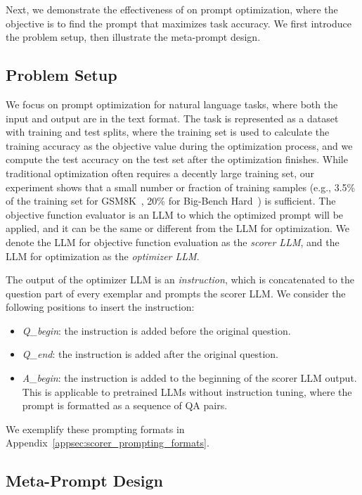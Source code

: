 Next, we demonstrate the effectiveness of \name{} on prompt optimization, where the objective is to find the prompt that maximizes task accuracy. We first introduce the problem setup, then illustrate the meta-prompt design.

\subsection{Problem Setup}
\label{sec:setup}

We focus on prompt optimization for natural language tasks, where both the input and output are in the text format. 
The task is represented as a dataset with training and test splits, where the training set is used to calculate the training accuracy as the objective value during the optimization process, and we compute the test accuracy on the test set after the optimization finishes. 
While traditional optimization often requires a decently large training set, our experiment shows that a small number or fraction of training samples (e.g., 3.5\% of the training set for GSM8K~\citep{cobbe2021training}, 20\% for Big-Bench Hard~\citep{suzgun2022challenging}) is sufficient. 
The objective function evaluator is an LLM to which the optimized prompt will be applied, and it can be the same or different from the LLM for optimization. 
We denote the LLM for objective function evaluation as the \emph{scorer LLM}, and the LLM for optimization as the \emph{optimizer LLM}.

The output of the optimizer LLM is an \emph{instruction}, which is concatenated to the question part of every exemplar and prompts the scorer LLM. 
We consider the following positions to insert the instruction:

\begin{itemize}[leftmargin=2em,topsep=0pt,partopsep=1ex,parsep=0ex]
\item \emph{Q\_begin}: the instruction is added before the original question.
\item \emph{Q\_end}: the instruction is added after the original question.
\item \emph{A\_begin}: the instruction is added to the beginning of the scorer LLM output. This is applicable to pretrained LLMs without instruction tuning, where the prompt is formatted as a sequence of QA pairs.
\end{itemize}

We exemplify these prompting formats in Appendix~\ref{appsec:scorer_prompting_formats}.

\subsection{Meta-Prompt Design}

